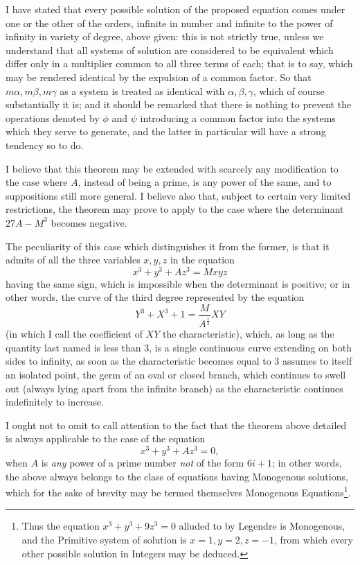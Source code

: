 \documentclass[11pt]{article}
\newcommand{\sourcepage}[1]{\marginpar{\scriptsize p.~#1}}
\begin{document}
{{\sourcepage{117}
I have stated that every possible solution of the proposed equation comes under one or the other of the orders, infinite in number and infinite to the power of infinity in variety of degree, above given: this is not strictly true, unless we understand that all systems of solution are considered to be equivalent which differ only in a multiplier common to all three terms of each; that is to say, which may be rendered identical by the expulsion of a common factor. So that $m\alpha,m\beta,m\gamma$ as a system is treated as identical with $\alpha,\beta,\gamma$, which of course substantially it is; and it should be remarked that there is nothing to prevent the operations denoted by $\phi$ and $\psi$ introducing a common factor into the systems which they serve to generate, and the latter in particular will have a strong tendency so to do.

I believe that this theorem may be extended with scarcely any modification to the case where $A$, instead of being a prime, is any power of the same, and to suppositions still more general. I believe also that, subject to certain very limited restrictions, the theorem may prove to apply to the case where the determinant $27A-M^3$ becomes negative.

The peculiarity of this case which distinguishes it from the former, is that it admits of all the three variables $x,y,z$ in the equation
\[
x^3+y^3+Az^3=Mxyz
\]
having the same sign, which is impossible when the determinant is positive; or in other words, the curve of the third degree represented by the equation
\[
Y^3+X^3+1=\frac{M}{A^{\frac{1}{3}}}XY
\]
(in which I call the coefficient of $XY$ the characteristic), which, as long as the quantity last named is less than 3, is a single continuous curve extending on both sides to infinity, as soon as the characteristic becomes equal to 3 assumes to itself an isolated point, the germ of an oval or closed branch, which continues to swell out (always lying apart from the infinite branch) as the characteristic continues indefinitely to increase.

I ought not to omit to call attention to the fact that the theorem above detailed is always applicable to the case of the equation
\[
x^3+y^3+Az^3=0,
\]
when $A$ is \emph{any} power of a prime number \emph{not} of the form $6i+1$; in other words, the above always belongs to the class of equations having Monogenous solutions, which for the sake of brevity may be termed themselves Monogenous Equations\footnote{Thus the equation $x^3+y^3+9z^3=0$ alluded to by Legendre is Monogenous, and the Primitive system of solution is $x=1,y=2,z=-1$, from which every other possible solution in Integers may be deduced.}.

}}
\end{document}
